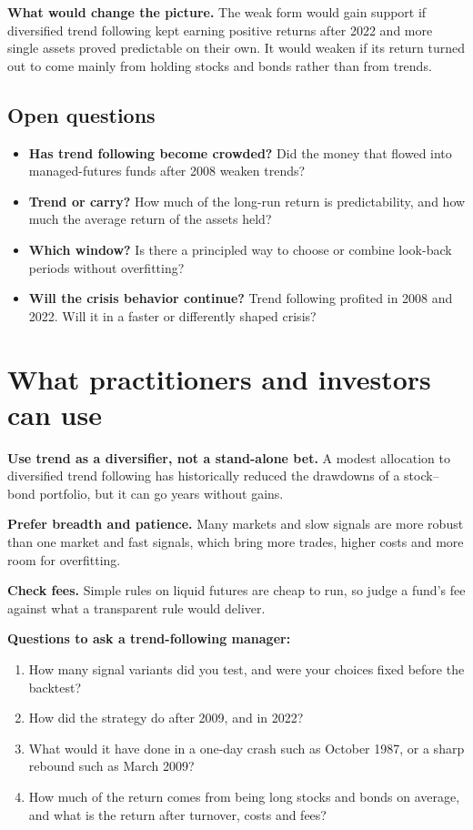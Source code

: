 \textbf{What would change the picture.} The weak form would gain support if diversified trend following kept earning positive returns after 2022 and more single assets proved predictable on their own. It would weaken if its return turned out to come mainly from holding stocks and bonds rather than from trends.

\subsection{Open questions}
\label{sec:08-open}

\begin{itemize}
  \item \textbf{Has trend following become crowded?} Did the money that flowed into managed-futures funds after 2008 weaken trends?
  \item \textbf{Trend or carry?} How much of the long-run return is predictability, and how much the average return of the assets held?
  \item \textbf{Which window?} Is there a principled way to choose or combine look-back periods without overfitting?
  \item \textbf{Will the crisis behavior continue?} Trend following profited in 2008 and 2022. Will it in a faster or differently shaped crisis?
\end{itemize}

\section{What practitioners and investors can use}
\label{sec:08-investors}

\textbf{Use trend as a diversifier, not a stand-alone bet.} A modest allocation to diversified trend following has historically reduced the drawdowns of a stock--bond portfolio, but it can go years without gains.

\textbf{Prefer breadth and patience.} Many markets and slow signals are more robust than one market and fast signals, which bring more trades, higher costs and more room for overfitting.

\textbf{Check fees.} Simple rules on liquid futures are cheap to run, so judge a fund's fee against what a transparent rule would deliver.

\textbf{Questions to ask a trend-following manager:}

\begin{enumerate}
  \item How many signal variants did you test, and were your choices fixed before the backtest?
  \item How did the strategy do after 2009, and in 2022?
  \item What would it have done in a one-day crash such as October 1987, or a sharp rebound such as March 2009?
  \item How much of the return comes from being long stocks and bonds on average, and what is the return after turnover, costs and fees?
\end{enumerate}

